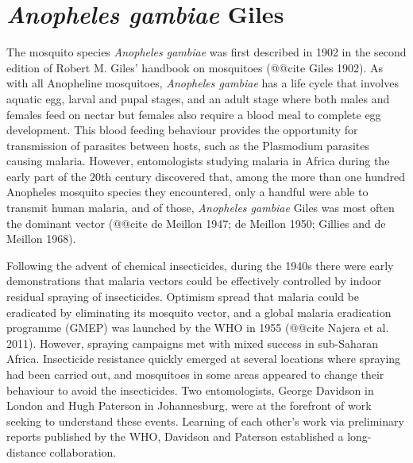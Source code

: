 \documentclass[a4paper,11pt,abstracton,hidelinks]{scrartcl}
\begin{document}
\tableofcontents


\section{\textit{Anopheles gambiae} Giles}

The mosquito species \textit{Anopheles gambiae} was first described in 1902 in the second edition of Robert M. Giles' handbook on mosquitoes (@@cite Giles 1902).
%
As with all Anopheline mosquitoes, \textit{Anopheles gambiae} has a life cycle that involves aquatic egg, larval and pupal stages, and an adult stage where both males and females feed on nectar but females also require a blood meal to complete egg development.
%
This blood feeding behaviour provides the opportunity for transmission of parasites between hosts, such as the Plasmodium parasites causing malaria.
%
However, entomologists studying malaria in Africa during the early part of the 20th century discovered that, among the more than one hundred Anopheles mosquito species they encountered, only a handful were able to transmit human malaria, and of those, \textit{Anopheles gambiae} Giles was most often the dominant vector (@@cite de Meillon 1947; de Meillon 1950; Gillies and de Meillon 1968).

Following the advent of chemical insecticides, during the 1940s there were early demonstrations that malaria vectors could be effectively controlled by indoor residual spraying of insecticides.
%
Optimism spread that malaria could be eradicated by eliminating its mosquito vector, and a global malaria eradication programme (GMEP) was launched by the WHO in 1955 (@@cite Najera et al. 2011).
%
However, spraying campaigns met with mixed success in sub-Saharan Africa.
%
Insecticide resistance quickly emerged at several locations where spraying had been carried out, and mosquitoes in some areas appeared to change their behaviour to avoid the insecticides.
%
Two entomologists, George Davidson in London and Hugh Paterson in Johannesburg, were at the forefront of work seeking to understand these events.
%
Learning of each other's work via preliminary reports published by the WHO, Davidson and Paterson established a long-distance collaboration.


\end{document}
